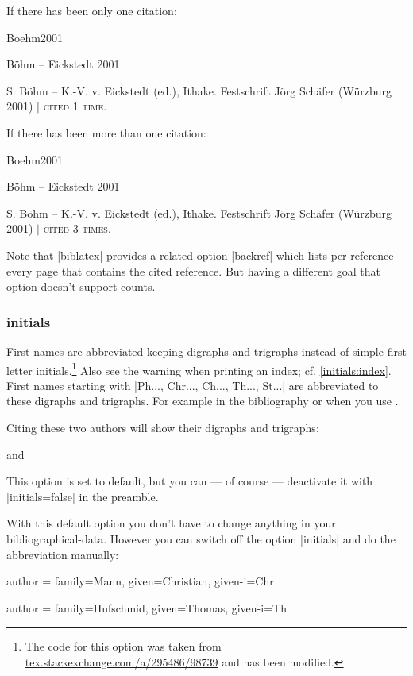 \documentclass[a4paper,
10pt,
greek,
french,
spanish,
italian,
ngerman,
english
]{ltxdoc}
\begin{document}
If there has been only one citation:
\begin{bibbox}{Boehm2001}\footnotesize
\parbox[t]{3cm}{Böhm – Eickstedt 2001} \parbox[t]{8cm}{%
S. Böhm – K.-V. v. Eickstedt (ed.), Ithake. Festschrift Jörg Schäfer (Würzburg 2001) $\vert$  {\scshape cited 1 time.}}
\end{bibbox}

If there has been more than one citation:
\begin{bibbox}{Boehm2001}\footnotesize
\parbox[t]{3cm}{Böhm – Eickstedt 2001} \parbox[t]{8cm}{%
S. Böhm – K.-V. v. Eickstedt (ed.), Ithake. Festschrift Jörg Schäfer (Würzburg 2001) $\vert$  {\scshape cited 3 times.}}
\end{bibbox}

Note that |biblatex| provides a related option |backref| which lists per reference every page 
that contains the cited reference. But having a different goal that option doesn't support counts. 
 
\subsubsection{initials}\label{initials}
First names are abbreviated keeping digraphs and trigraphs instead of simple first letter initials.\footnote{The code for this option was taken from \href{http://tex.stackexchange.com/a/295486/98739}{tex.stackexchange.com/a/295486/98739} and has been modified.}
Also see the warning when printing an index; cf. \cref{initials:index}.
First names starting with |Ph..., Chr..., Ch..., Th..., St...| are abbreviated to these digraphs and trigraphs. For example in the bibliography or when you use .

Citing these two authors will show their digraphs and trigraphs:

\begin{example}
\citeauthor{Mann2011} and \citeauthor{Hufschmid2010}
\end{example}



This option is set to default, but you can --- of course --- deactivate it with |initials=false| in the preamble.

With this default option you don’t have to change anything in your bibliographical-data.
However  you can switch off the option |initials| and do the abbreviation manually:

\begin{code}
author = {family=Mann, given=Christian, given-i={Chr}}

author = {family=Hufschmid, given=Thomas, given-i={Th}}
\end{code}
\end{document}

